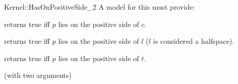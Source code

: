 \begin{ccRefFunctionObjectConcept}{Kernel::HasOnPositiveSide_2}
A model for this must provide:


{returns true iff $p$ lies on the positive side of $c$.}

{returns true iff $p$ lies on the positive side of $l$ 
($l$ is considered a halfspace).}

{returns true iff $p$ lies on the positive side of $t$.}

\ccRefines
{} (with two arguments)

\ccSeeAlso
{} \\
\\
\\

\end{ccRefFunctionObjectConcept}
